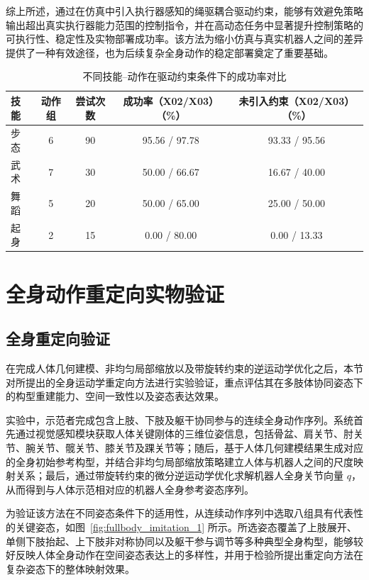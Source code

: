 综上所述，通过在仿真中引入执行器感知的绳驱耦合驱动约束，能够有效避免策略输出超出真实执行器能力范围的控制指令，并在高动态任务中显著提升控制策略的可执行性、稳定性及实物部署成功率。该方法为缩小仿真与真实机器人之间的差异提供了一种有效途径，也为后续复杂全身动作的稳定部署奠定了重要基础。

                             
\begin{table}[htbp]
	\centering
	\caption{不同技能–动作在驱动约束条件下的成功率对比}
	\label{tab:skill_motion_success}
	\begin{tabular}{lcccc}
		\toprule
		技能 & 动作组 & 尝试次数 & 成功率（X02/X03）（\%） & 未引入约束（X02/X03）（\%）\\
		\midrule
		步态   & 6 & 90 &  95.56 / 97.78 & 93.33 / 95.56  \\
		
		武术   & 7 & 30 & 50.00 / 66.67 & 16.67 / 40.00 \\
		舞蹈   & 5 & 20 & 50.00 / 65.00 & 25.00 / 50.00 \\
		起身   & 2 & 15 & 0.00  / 80.00 & 0.00  / 13.33 \\
		\bottomrule
	\end{tabular}
\end{table}



\section{全身动作重定向实物验证}

\subsection{全身重定向验证}
\label{subsec:fullbody_validation}

在完成人体几何建模、非均匀局部缩放以及带旋转约束的逆运动学优化之后，本节对所提出的全身运动学重定向方法进行实验验证，重点评估其在多肢体协同姿态下的构型重建能力、空间一致性以及姿态表达效果。

实验中，示范者完成包含上肢、下肢及躯干协同参与的连续全身动作序列。系统首先通过视觉感知模块获取人体关键刚体的三维位姿信息，包括骨盆、肩关节、肘关节、腕关节、髋关节、膝关节及踝关节等；随后，基于人体几何建模结果生成对应的全身初始参考构型，并结合非均匀局部缩放策略建立人体与机器人之间的尺度映射关系；最后，通过带旋转约束的微分逆运动学优化求解机器人全身关节向量 $q$，从而得到与人体示范相对应的机器人全身参考姿态序列。

为验证该方法在不同姿态条件下的适用性，从连续动作序列中选取八组具有代表性的关键姿态，如图~\ref{fig:fullbody_imitation_1} 所示。所选姿态覆盖了上肢展开、单侧下肢抬起、上下肢非对称协同以及躯干参与调节等多种典型全身构型，能够较好反映人体全身动作在空间姿态表达上的多样性，并用于检验所提出重定向方法在复杂姿态下的整体映射效果。

